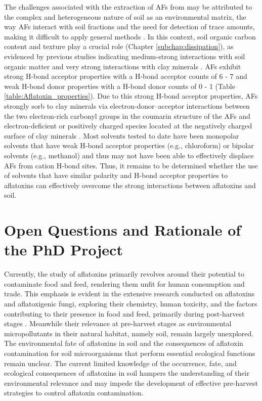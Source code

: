 The challenges associated with the extraction  of AFs from may be attributed to the complex and heterogeneous nature of soil as an environmental matrix, the way AFs interact with soil fractions and the need for detection of trace amounts, making it difficult to apply general methods \citep{fouche2020aflatoxins}. In this context, soil organic carbon content and texture play a crucial role (Chapter \ref{subchap:dissipation}), as evidenced by previous studies indicating medium-strong interactions with soil organic matter \citep{schenzel2012experimentally, van2006vitro} and very strong interactions with clay minerals \citep{kang2016understanding, goldberg1985aflatoxin}. AFs exhibit strong H-bond acceptor properties with a H-bond acceptor counts of 6 - 7 and weak H-bond donor properties with a H-bond donor counts of 0 - 1 (Table \ref{table:Aflatoxin_properties}). Due to this strong H-bond acceptor properties, AFs strongly sorb to clay minerals via electron-donor–acceptor interactions between the two electron-rich carbonyl groups in the coumarin structure of the AFs and electron-deficient or positively charged species located at the negatively charged surface of clay minerals \citep{kang2016understanding}. Most solvents tested to date have been monopolar solvents that have weak H-bond acceptor properties (e.g., chloroform) or bipolar solvents (e.g., methanol) and thus may not have been able to effectively displace AFs from cation H-bond sites. Thus, it remains to be determined whether the use of solvents that have similar polarity and H-bond acceptor properties to aflatoxins can effectively overcome the strong interactions between aflatoxins and soil.


\section{Open Questions and Rationale of the PhD Project}

Currently, the study of aflatoxins primarily revolves around their potential to contaminate food and feed, rendering them unfit for human consumption and trade. This emphasis is evident in the extensive research conducted on aflatoxins and aflatoxigenic fungi, exploring their chemistry, human toxicity, and the factors contributing to their presence in food and feed, primarily during post-harvest stages \citep{fouche2020aflatoxins}. Meanwhile their relevance at pre-harvest stages as environmental micropollutants in their natural habitat, namely soil, remain largely unexplored. The environmental fate of aflatoxins in soil and the consequences of aflatoxin contamination for soil microorganisms that perform essential ecological functions remain unclear. The current limited knowledge of the occurrence, fate, and ecological consequences of aflatoxins in soil hampers the understanding of their environmental relevance and may impede the development of effective pre-harvest strategies to control aflatoxin contamination.


